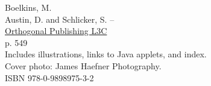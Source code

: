 Boelkins, M.\\
\hspace*{2em} Austin, D. and Schlicker, S. -- \\
\hspace*{1em} \href{http://orthogonalpublishing.com/}{Orthogonal Publishing L3C} \\
\hspace*{2em} p. 549  \\
\hspace*{2em} Includes illustrations, links to Java applets, and index. \\
\hspace*{2em} Cover photo: James Haefner Photography. \\
\hspace*{2em} ISBN 978-0-9898975-3-2 \\




\vspace*{2\baselineskip}
\endgroup